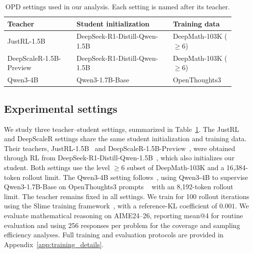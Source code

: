 \begin{table}[t]
\centering
\small
\caption{OPD settings used in our analysis. Each setting is named after its teacher.}
\label{tab:opd-settings}
\begin{tabular}{@{}p{0.28\linewidth}p{0.39\linewidth}p{0.25\linewidth}@{}}
\toprule
Teacher & Student initialization & Training data \\
\midrule
JustRL-1.5B & DeepSeek-R1-Distill-Qwen-1.5B & DeepMath-103K ($\geq6$) \\
DeepScaleR-1.5B-Preview & DeepSeek-R1-Distill-Qwen-1.5B & DeepMath-103K ($\geq6$) \\
Qwen3-4B & Qwen3-1.7B-Base & OpenThoughts3 \\
\bottomrule
\end{tabular}
\end{table}

\subsection{Experimental settings}
\label{sec:opd-experimental-settings}

We study three teacher--student settings, summarized in Table~\ref{tab:opd-settings}.
The JustRL and DeepScaleR settings share the same student initialization and training data.
Their teachers, JustRL-1.5B~\citep{he2025justrlscaling15bllm} and DeepScaleR-1.5B-Preview~\citep{deepscaler2025}, were obtained through RL from DeepSeek-R1-Distill-Qwen-1.5B~\citep{guo2025deepseek}, which also initializes our student. Both settings use the level $\geq6$ subset of DeepMath-103K and a 16,384-token rollout limit.
The Qwen3-4B setting follows~\citet{li2026rethinkingopd}, using Qwen3-4B to supervise Qwen3-1.7B-Base on OpenThoughts3  prompts ~\citep{guha2025openthoughtsdatarecipesreasoning} with an 8,192-token rollout limit. The teacher remains fixed in all settings.
We train for 100 rollout iterations using the Slime training framework~\citep{slime_github}, with a reference-KL coefficient of $0.001$. We evaluate mathematical reasoning on AIME24--26, reporting mean@4 for routine evaluation and using 256 responses per problem for the coverage and sampling efficiency analyses. Full training and evaluation protocols are provided in Appendix~\ref{app:training_details}.
